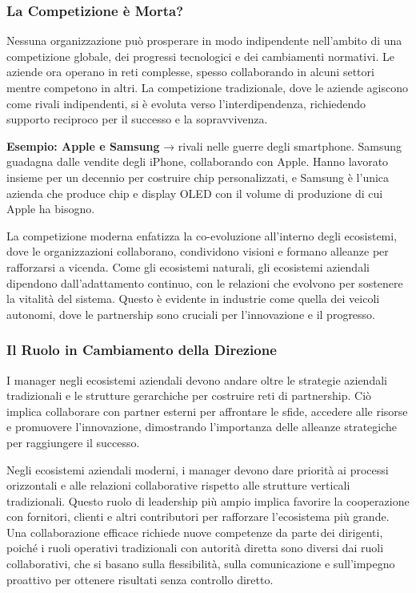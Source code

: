 \documentclass{article}
\begin{document}
\subsubsection{La Competizione è Morta?}

Nessuna organizzazione può prosperare in modo indipendente nell'ambito di una competizione globale, dei progressi tecnologici e dei cambiamenti normativi. Le aziende ora operano in reti complesse, spesso collaborando in alcuni settori mentre competono in altri. La competizione tradizionale, dove le aziende agiscono come rivali indipendenti, si è evoluta verso l'interdipendenza, richiedendo supporto reciproco per il successo e la sopravvivenza.

\textbf{Esempio: Apple e Samsung} → rivali nelle guerre degli smartphone. Samsung guadagna dalle vendite degli iPhone, collaborando con Apple. Hanno lavorato insieme per un decennio per costruire chip personalizzati, e Samsung è l'unica azienda che produce chip e display OLED con il volume di produzione di cui Apple ha bisogno.

La competizione moderna enfatizza la co-evoluzione all'interno degli ecosistemi, dove le organizzazioni collaborano, condividono visioni e formano alleanze per rafforzarsi a vicenda. Come gli ecosistemi naturali, gli ecosistemi aziendali dipendono dall'adattamento continuo, con le relazioni che evolvono per sostenere la vitalità del sistema. Questo è evidente in industrie come quella dei veicoli autonomi, dove le partnership sono cruciali per l'innovazione e il progresso.

\subsubsection{Il Ruolo in Cambiamento della Direzione}

I manager negli ecosistemi aziendali devono andare oltre le strategie aziendali tradizionali e le strutture gerarchiche per costruire reti di partnership. Ciò implica collaborare con partner esterni per affrontare le sfide, accedere alle risorse e promuovere l'innovazione, dimostrando l'importanza delle alleanze strategiche per raggiungere il successo.

Negli ecosistemi aziendali moderni, i manager devono dare priorità ai processi orizzontali e alle relazioni collaborative rispetto alle strutture verticali tradizionali. Questo ruolo di leadership più ampio implica favorire la cooperazione con fornitori, clienti e altri contributori per rafforzare l'ecosistema più grande. Una collaborazione efficace richiede nuove competenze da parte dei dirigenti, poiché i ruoli operativi tradizionali con autorità diretta sono diversi dai ruoli collaborativi, che si basano sulla flessibilità, sulla comunicazione e sull'impegno proattivo per ottenere risultati senza controllo diretto.
\end{document}
